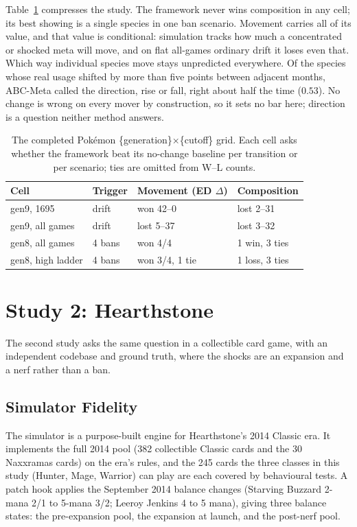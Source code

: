 \documentclass[journal]{IEEEtran}
\newcommand{\pkmn}{Pok\'emon}
\begin{document}
Table~\ref{tab:grid} compresses the study. The framework never wins
composition in any cell; its best showing is a single species in one ban
scenario. Movement carries all of its value, and that value is
conditional: simulation tracks how much a concentrated or shocked meta
will move, and on flat all-games ordinary drift it loses even that.
Which way individual species move stays unpredicted everywhere. Of the
species whose real usage shifted by more than five points between adjacent
months, ABC-Meta called the direction, rise or fall, right about half the
time ($0.53$). No change is wrong on every mover by construction, so it sets
no bar here; direction is a question neither method answers.

\begin{table}[t]
\caption{The completed \pkmn{} \{generation\}$\times$\{cutoff\} grid. Each
cell asks whether the framework beat its no-change baseline per transition
or per scenario; ties are omitted from W--L counts.}
\label{tab:grid}
\centering
\begin{tabular}{@{}llll@{}}
\toprule
Cell & Trigger & Movement (ED $\Delta$) & Composition \\
\midrule
gen9, 1695 & drift & won 42--0 & lost 2--31 \\
gen9, all games & drift & lost 5--37 & lost 3--32 \\
gen8, all games & 4 bans & won 4/4 & 1 win, 3 ties \\
gen8, high ladder & 4 bans & won 3/4, 1 tie & 1 loss, 3 ties \\
\bottomrule
\end{tabular}
\end{table}

\section{Study 2: Hearthstone}
\label{sec:hs}

The second study asks the same question in a collectible card game, with an independent codebase and ground truth, where the shocks are an expansion and a nerf rather than a ban.

\subsection{Simulator Fidelity}
\label{sec:hsfidelity}

The simulator is a purpose-built engine for Hearthstone's 2014 Classic
era. It implements the full 2014 pool (382 collectible Classic cards and
the 30 Naxxramas cards) on the era's rules, and the 245 cards the three
classes in this study (Hunter, Mage, Warrior) can play are each covered
by behavioural tests. A patch hook applies the September 2014 balance
changes (Starving Buzzard 2-mana 2/1 to 5-mana 3/2; Leeroy Jenkins 4 to 5
mana), giving three balance states: the pre-expansion pool, the expansion
at launch, and the post-nerf pool.
\end{document}
